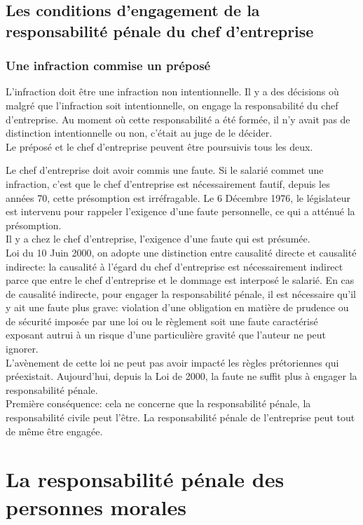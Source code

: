 \documentclass[10pt, a4paper, openany]{book}
\begin{document}
\subsection{Les conditions d'engagement de la responsabilité pénale du chef d'entreprise}

\subsubsection{Une infraction commise un préposé}

L'infraction doit être une infraction non intentionnelle. Il y a des décisions où malgré que l'infraction soit intentionnelle, on engage la responsabilité du chef d'entreprise. Au moment où cette responsabilité a été formée, il n'y avait pas de distinction intentionnelle ou non, c'était au juge de le décider. \\
Le préposé et le chef d'entreprise peuvent être poursuivis tous les deux. 


Le chef d'entreprise doit avoir commis une faute. Si le salarié commet une infraction, c'est que le chef d'entreprise est nécessairement fautif, depuis les années 70, cette présomption est irréfragable. Le 6 Décembre 1976, le législateur est intervenu pour rappeler l'exigence d'une faute personnelle, ce qui a atténué la présomption. \\
Il y a chez le chef d'entreprise, l'exigence d'une faute qui est présumée. \\
Loi du 10 Juin 2000, on adopte une distinction entre causalité directe et causalité indirecte: la causalité à l'égard du chef d'entreprise est nécessairement indirect parce que entre le chef d'entreprise et le dommage est interposé le salarié. En cas de causalité indirecte, pour engager la responsabilité pénale, il est nécessaire qu'il y ait une faute plus grave: violation d'une obligation en matière de prudence ou de sécurité imposée par une loi ou le règlement soit une faute caractérisé exposant autrui à un risque d'une particulière gravité que l'auteur ne peut ignorer. \\
L'avènement de cette loi ne peut pas avoir impacté les règles prétoriennes qui préexistait. Aujourd'hui, depuis la Loi de 2000, la faute ne suffit plus à engager la responsabilité pénale. \\
Première conséquence: cela ne concerne que la responsabilité pénale, la responsabilité civile peut l'être. La responsabilité pénale de l'entreprise peut tout de même être engagée. 

\section{La responsabilité pénale des personnes morales}
\end{document}
